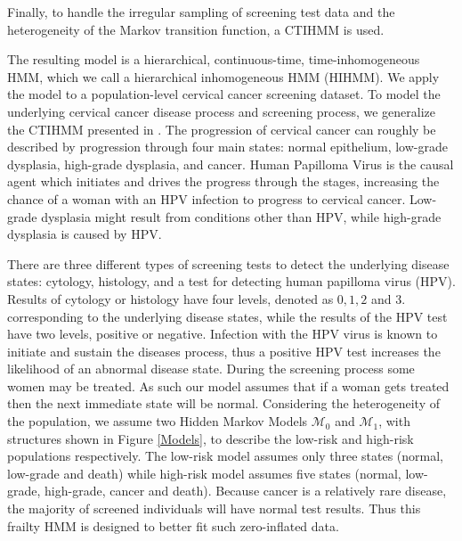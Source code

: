 \documentclass{article}
\begin{document}
Finally, to handle the irregular sampling of screening test data and the heterogeneity of the Markov transition function, a CTIHMM is used. 

The resulting model is a hierarchical, continuous-time, time-inhomogeneous HMM, which we call a hierarchical inhomogeneous HMM (HIHMM). We apply the model to a population-level cervical cancer screening dataset.  To model the underlying cervical cancer disease process and screening process, we generalize the CTIHMM presented in \cite{Soper_et_al_2018}.  The progression of cervical cancer can roughly be described by progression through four main states: normal epithelium, low-grade dysplasia, high-grade dysplasia, and cancer.  Human Papilloma Virus is the causal agent which initiates and drives the progress through the stages,  increasing the chance of a woman with an HPV infection to progress to cervical cancer.  Low-grade dysplasia might result from conditions other than HPV, while high-grade dysplasia is caused by HPV.

There are three different types of screening tests to detect the underlying disease states: cytology, histology, and a test for detecting human papilloma virus (HPV). Results of cytology or histology have four levels, denoted as $0, 1, 2$ and $3$. corresponding to the underlying disease states, while the results of the HPV test have two levels, positive or negative. Infection with the HPV virus is known to initiate and sustain the diseases process, thus a positive HPV test increases the likelihood of an abnormal disease state.
During the screening process some women may be treated. As such our model assumes that if a woman gets treated then the next immediate state will be normal. Considering the heterogeneity of the population, we assume two Hidden Markov Models $\mathcal{M}_0$ and $\mathcal{M}_1$, with structures shown in Figure \ref{Models}, to describe the low-risk and high-risk populations respectively. The low-risk model assumes only three states (normal, low-grade and death) while high-risk model assumes five states (normal, low-grade, high-grade, cancer and death).  Because cancer is a relatively rare disease, the majority of screened individuals will have normal test results.  Thus this frailty HMM is designed to better fit such zero-inflated data. 
\end{document}

